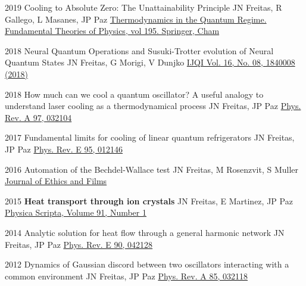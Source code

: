 

\begin{cvpubs}
\cvpub
    {2019}
    {Cooling to Absolute Zero: The Unattainability Principle}
    {JN Freitas, R Gallego, L Masanes,  JP Paz}
    {\href{https://link.springer.com/chapter/10.1007/978-3-319-99046-0_25}{Thermodynamics in the Quantum Regime. Fundamental Theories of Physics, vol 195. Springer, Cham}}

\cvpub
    {2018}
    {Neural Quantum Operations and Susuki-Trotter evolution of Neural Quantum States}
    {JN Freitas, G Morigi, V Dunjko}
    {\href{https://www.worldscientific.com/doi/abs/10.1142/S0219749918400087}{IJQI Vol. 16, No. 08, 1840008 (2018)}}

\cvpub
    {2018}
    {How much can we cool a quantum oscillator? A useful analogy to understand laser cooling as a thermodynamical process}
    {JN Freitas, JP Paz}
    {\href{https://journals.aps.org/pra/abstract/10.1103/PhysRevA.97.032104}{Phys. Rev. A 97, 032104}}

\cvpub
    {2017}
    {Fundamental limits for cooling of linear quantum refrigerators}
    {JN Freitas, JP Paz}
    {\href{http://journals.aps.org/pre/abstract/10.1103/PhysRevE.95.012146}{Phys. Rev. E 95, 012146}}

\cvpub
    {2016}
    {Automation of the Bechdel-Wallace test}
    {JN Freitas, M Rosenzvit, S Muller}
    {\href{http://www.journal.eticaycine.org/Automation-of-the-Bechdel-Wallace}{Journal of Ethics and Films}}

\cvpub
    {2015}
    {\bf Heat transport through ion crystals}
    {JN Freitas, E Martinez, JP Paz}
    {\href{http://iopscience.iop.org/article/10.1088/0031-8949/91/1/013007/meta}{Physica Scripta, Volume 91, Number 1}}

\cvpub
    {2014}
    {Analytic solution for heat flow through a general harmonic network}
    {JN Freitas, JP Paz}
    {\href{http://journals.aps.org/pre/abstract/10.1103/PhysRevE.90.042128}{Phys. Rev. E 90, 042128}}

\cvpub
    {2012}
    {Dynamics of Gaussian discord between two oscillators interacting with a common environment}
    {JN Freitas, JP Paz}
    {\href{http://pra.aps.org/abstract/PRA/v85/i3/e032118}{Phys. Rev. A 85, 032118}}

\end{cvpubs}

